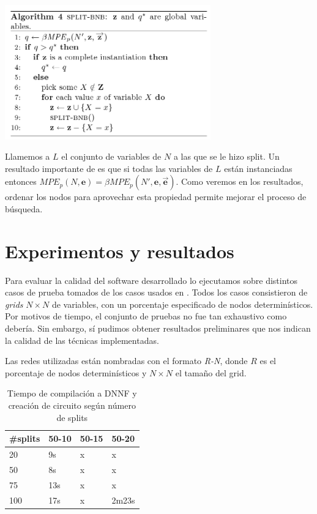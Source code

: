 \documentclass[11pt, letterpaper]{article}
\begin{document}
\begin{center}
\includegraphics[width=24em]{splitbnb.png}\\
\end{center}

Llamemos a $L$ el conjunto de variables de $N$ a las que se le hizo
split. Un resultado importante de \cite{ChoiChaviraDarwiche07} es que
si todas las variables de $L$ están instanciadas entonces $MPE_p(N,
\mathbf{e}) = \beta MPE_p(N', \mathbf{e}, \vec{\mathbf{e}})$.
Como veremos en los resultados, ordenar los nodos para aprovechar esta propiedad
permite mejorar el proceso de búsqueda.

\section{Experimentos y resultados}

Para evaluar la calidad del software desarrollado lo ejecutamos sobre distintos
casos de prueba tomados de los casos usados en \cite{sangbeamekautzAAAI05}.
Todos los casos consistieron de \emph{grids} $N \times N$ de variables, con un
porcentaje especificado de nodos determinísticos. Por motivos de tiempo, el
conjunto de pruebas no fue tan exhaustivo como debería. Sin embargo, sí pudimos
obtener resultados preliminares que nos indican la calidad de las técnicas
implementadas.

Las redes utilizadas están nombradas con el formato \emph{R-N}, donde $R$ es el
porcentaje de nodos determinísticos y $N \times N$ el tamaño del grid.

\begin{table}
\begin{center}
  \begin{tabular}{l | l | l | l}
    \hline
    \#splits & 50-10 & 50-15 & 50-20 \\
    \hline
    20 & 9s & x & x \\
    50 & 8s & x & x \\
    75 & 13s & x & x \\
    100 & 17s & x & 2m23s \\
  \end{tabular}
  \caption{Tiempo de compilación a DNNF y creación de circuito según número de splits}
\end{center}
\end{table}
\end{document}
